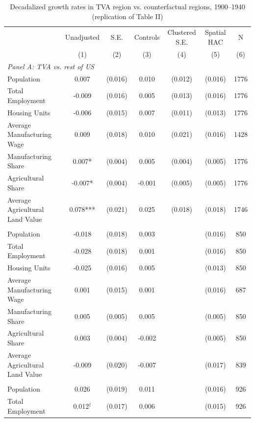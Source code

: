 \begin{table}[htbp]
\centering
\footnotesize
\setlength{\tabcolsep}{4pt}
\caption{Decadalized growth rates in TVA region vs. counterfactual regions, 1900--1940 (replication of Table II)}
\label{tab:km_t2}
\begin{tabular}{lcccccc}
\toprule
 & Unadjusted & S.E. & Controls & Clustered S.E. & Spatial HAC & N \\
 & (1) & (2) & (3) & (4) & (5) & (6) \\
\midrule
\multicolumn{7}{l}{\textit{Panel A: TVA vs. rest of US}} \\
Population & 0.007 & (0.016) & 0.010 & (0.012) & (0.016) & 1776 \\
Total Employment & -0.009 & (0.016) & 0.005 & (0.013) & (0.016) & 1776 \\
Housing Units & -0.006 & (0.015) & 0.007 & (0.011) & (0.013) & 1776 \\
Average Manufacturing Wage & 0.009 & (0.018) & 0.010 & (0.021) & (0.016) & 1428 \\
Manufacturing Share & 0.007* & (0.004) & 0.005 & (0.004) & (0.005) & 1776 \\
Agricultural Share & -0.007* & (0.004) & -0.001 & (0.005) & (0.005) & 1776 \\
Average Agricultural Land Value & 0.078*** & (0.021) & 0.025 & (0.018) & (0.018) & 1746 \\
\addlinespace
\multicolumn{7}{l}{\textit{Panel B: TVA vs. US South}} \\
Population & -0.018 & (0.018) & 0.003 &  & (0.016) & 850 \\
Total Employment & -0.028 & (0.018) & 0.001 &  & (0.016) & 850 \\
Housing Units & -0.025 & (0.016) & 0.005 &  & (0.013) & 850 \\
Average Manufacturing Wage & 0.001 & (0.015) & 0.001 &  & (0.016) & 687 \\
Manufacturing Share & 0.005 & (0.005) & 0.005 &  & (0.005) & 850 \\
Agricultural Share & 0.003 & (0.004) & -0.002 &  & (0.005) & 850 \\
Average Agricultural Land Value & -0.009 & (0.020) & -0.007 &  & (0.017) & 839 \\
\addlinespace
\multicolumn{7}{l}{\textit{Panel C: TVA vs. proposed authorities}} \\
Population & 0.026 & (0.019) & 0.011 &  & (0.016) & 926 \\
Total Employment & 0.012$^\dagger$ & (0.017) & 0.006 &  & (0.015) & 926 \\

\end{tabular}
\end{table}
